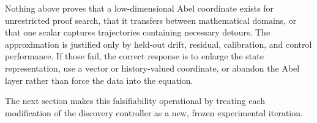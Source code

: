 \begin{caution}
Nothing above proves that a low-dimensional Abel coordinate exists for unrestricted proof search, that it transfers between mathematical domains, or that one scalar captures trajectories containing necessary detours. The approximation is justified only by held-out drift, residual, calibration, and control performance. If those fail, the correct response is to enlarge the state representation, use a vector or history-valued coordinate, or abandon the Abel layer rather than force the data into the equation.
\end{caution}

The next section makes this falsifiability operational by treating each modification of the discovery controller as a new, frozen experimental iteration.
